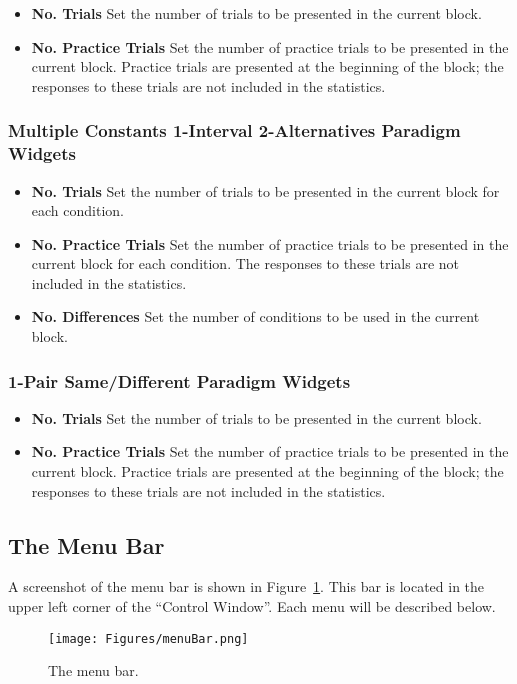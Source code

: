 \begin{itemize}
\item \textbf{No. Trials} Set the number of trials to be presented in the current block.
\item \textbf{No. Practice Trials} Set the number of practice trials to be presented in the current block. Practice trials are presented at the
  beginning of the block; the responses to these trials are not included in the statistics.
\end{itemize}

\subsubsection{Multiple Constants 1-Interval 2-Alternatives Paradigm Widgets}

\begin{itemize}
\item \textbf{No. Trials} Set the number of trials to be presented in the current block for each condition.
\item \textbf{No. Practice Trials} Set the number of practice trials to be presented in the current block for each condition. The responses to these trials are not included in the statistics.
\item \textbf{No. Differences} Set the number of conditions to be used in the current block.
\end{itemize}

\subsubsection{1-Pair Same/Different Paradigm Widgets}

\begin{itemize}
\item \textbf{No. Trials} Set the number of trials to be presented in the current block.
\item \textbf{No. Practice Trials} Set the number of practice trials to be presented in the current block. Practice trials are presented at the
  beginning of the block; the responses to these trials are not included in the statistics.
\end{itemize}

\subsection{The Menu Bar}
A screenshot of the menu bar is shown in Figure~\ref{fig:menuBar}. This bar is located in the upper left corner of the ``Control Window''. Each menu will be described below.
\begin{figure}[!h]
   \caption{The menu bar.}
   \centering
   \texttt{[image: Figures/menuBar.png]}
   \label{fig:menuBar}
 \end{figure}

